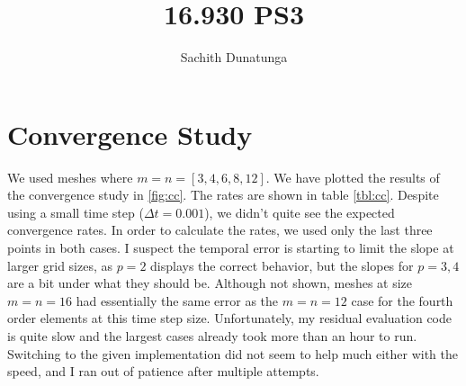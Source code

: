\documentclass{article}
\begin{document}
\author{Sachith Dunatunga}
\title{16.930 PS3}
\maketitle

\section{Convergence Study}
We used meshes where $m = n = [3, 4, 6, 8, 12]$.
We have plotted the results of the convergence study in \ref{fig:cc}.
The rates are shown in table \ref{tbl:cc}.
Despite using a small time step ($\Delta t = 0.001$), we didn't quite see the expected convergence rates.
In order to calculate the rates, we used only the last three points in both cases.
I suspect the temporal error is starting to limit the slope at larger grid sizes, as $p=2$ displays the correct behavior, but the slopes for $p = 3,4$ are a bit under what they should be.
Although not shown, meshes at size $m = n = 16$ had essentially the same error as the $m = n = 12$ case for the fourth order elements at this time step size.
Unfortunately, my residual evaluation code is quite slow and the largest cases already took more than an hour to run.
Switching to the given implementation did not seem to help much either with the speed, and I ran out of patience after multiple attempts.
\end{document}
